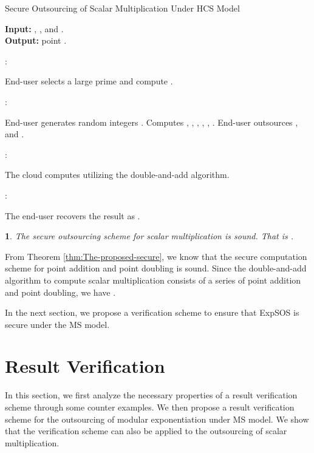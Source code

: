 \documentclass[english,draftcls,onecolumn,11pt]{IEEEtran}
\theoremstyle{definition}
\theoremstyle{plain}
\newtheorem{thm}{\protect\theoremname}
\theoremstyle{plain}
\theoremstyle{definition}
\providecommand{\theoremname}{Theorem}
\begin{document}
\begin{algorithm}[tbh]
\caption{Secure Outsourcing of Scalar Multiplication Under HCS Model\label{alg:Secure-Outsourcing}}

\textbf{Input:} , ,  and .\\
\textbf{Output:} point .

:
\begin{algorithmic}[1] 
\STATE End-user selects a large prime  and compute .
\end{algorithmic} 

:
\begin{algorithmic}[1] 
\STATE End-user generates random integers .
\STATE Computes , , , , , . 
\STATE End-user outsources ,  and .
\end{algorithmic} 

:
\begin{algorithmic}[1] 
\STATE The cloud computes  utilizing the double-and-add algorithm.
\end{algorithmic}

:
\begin{algorithmic}[1] 
\STATE The end-user recovers the result  as .
\end{algorithmic} 
\end{algorithm}
\begin{thm}
The secure outsourcing scheme for scalar multiplication is sound.
That is .\end{thm}
\begin{IEEEproof}
From Theorem \ref{thm:The-proposed-secure}, we know that the secure
computation scheme for point addition and point doubling is sound.
Since the double-and-add algorithm to compute scalar multiplication
consists of a series of point addition and point doubling, we have
.
\end{IEEEproof}
In the next section, we propose a verification scheme to ensure that
ExpSOS is secure under the MS model. 


\section{Result Verification \label{sec:Result-Verification}}

In this section, we first analyze the necessary properties of a result
verification scheme through some counter examples. We then propose
a result verification scheme for the outsourcing of modular exponentiation
under MS model. We show that the verification scheme can also be applied
to the outsourcing of scalar multiplication.
\end{document}
